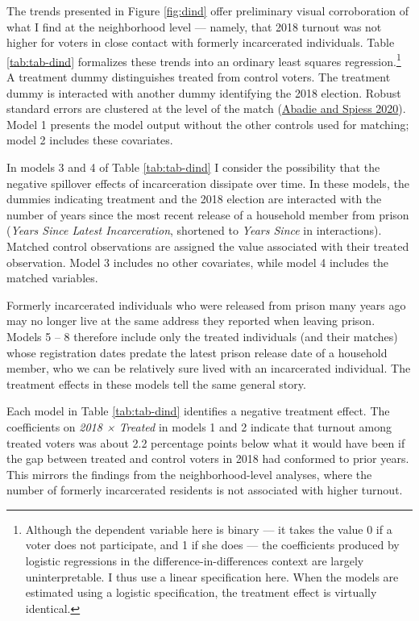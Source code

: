 \documentclass[
  12pt,
]{article}
\begin{document}
The trends presented in Figure \ref{fig:dind} offer preliminary visual corroboration of what I find at the neighborhood level --- namely, that 2018 turnout was not higher for voters in close contact with formerly incarcerated individuals. Table \ref{tab:tab-dind} formalizes these trends into an ordinary least squares regression.\footnote{Although the dependent variable here is binary --- it takes the value 0 if a voter does not participate, and 1 if she does --- the coefficients produced by logistic regressions in the difference-in-differences context are largely uninterpretable. I thus use a linear specification here. When the models are estimated using a logistic specification, the treatment effect is virtually identical.} A treatment dummy distinguishes treated from control voters. The treatment dummy is interacted with another dummy identifying the 2018 election. Robust standard errors are clustered at the level of the match (\protect\hyperlink{ref-Abadie2020}{Abadie and Spiess 2020}). Model 1 presents the model output without the other controls used for matching; model 2 includes these covariates.

In models 3 and 4 of Table \ref{tab:tab-dind} I consider the possibility that the negative spillover effects of incarceration dissipate over time. In these models, the dummies indicating treatment and the 2018 election are interacted with the number of years since the most recent release of a household member from prison (\emph{Years Since Latest Incarceration}, shortened to \emph{Years Since} in interactions). Matched control observations are assigned the value associated with their treated observation. Model 3 includes no other covariates, while model 4 includes the matched variables.

Formerly incarcerated individuals who were released from prison many years ago may no longer live at the same address they reported when leaving prison. Models 5 -- 8 therefore include only the treated individuals (and their matches) whose registration dates predate the latest prison release date of a household member, who we can be relatively sure lived with an incarcerated individual. The treatment effects in these models tell the same general story.

\begin{singlespace}

\end{singlespace}

Each model in Table \ref{tab:tab-dind} identifies a negative treatment effect. The coefficients on \emph{2018 × Treated} in models 1 and 2 indicate that turnout among treated voters was about 2.2 percentage points below what it would have been if the gap between treated and control voters in 2018 had conformed to prior years. This mirrors the findings from the neighborhood-level analyses, where the number of formerly incarcerated residents is not associated with higher turnout.
\end{document}
